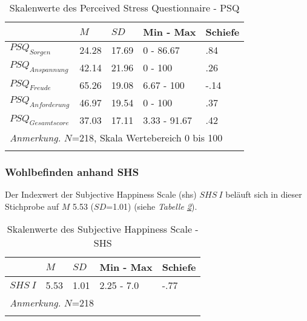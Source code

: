 \begin{table}[hb]
\begin{tabular}{m{6em} m{3em}  m{3em}  m{5em} m{3em}} 
  \hline
  & $M$ & $SD$ & Min - Max & Schiefe\\
  \hline
  $PSQ_{Sorgen}$ & 24.28 & 17.69 & 0 - 86.67 & .84 \\
  $PSQ_{Anspannung}$ & 42.14 & 21.96 & 0 - 100 & .26\\
  $PSQ_{Freude}$ & 65.26 & 19.08 & 6.67 - 100 & -.14\\
  $PSQ_{Anforderung}$ & 46.97 & 19.54 & 0 - 100 & .37 \\
  $PSQ_{Gesamtscore}$ & 37.03 & 17.11 & 3.33 - 91.67 & .42\\
  \hline
  \multicolumn{5}{l}{\textit{Anmerkung.} $N$=218, Skala Wertebereich 0 bis 100}\\
  &&&&\\
\end{tabular}
\caption{Skalenwerte des Perceived Stress Questionnaire - PSQ}
\label{table:PSQDeskriptiv}
\end{table}


\subsubsection{Wohlbefinden anhand SHS}
Der Indexwert der Subjective Happiness Scale (\acrshort{shs}) $SHS~I$ beläuft sich in dieser Stichprobe auf $M$ 5.53 ($SD$=1.01) (siehe \textit{Tabelle \ref{table:SHSDeskriptiv}}).

\begin{table}[hb]
\begin{tabular}{m{6em} m{3em}  m{3em}  m{5em} m{3em}} 
  \hline
  & $M$ & $SD$ & Min - Max & Schiefe\\
  \hline
  $SHS~I$ & 5.53 & 1.01 & 2.25 - 7.0 & -.77 \\
  \hline
  \multicolumn{5}{l}{\textit{Anmerkung.} $N$=218}\\
  &&&&\\
\end{tabular}
\caption{Skalenwerte des Subjective Happiness Scale - SHS}
\label{table:SHSDeskriptiv}
\end{table}

